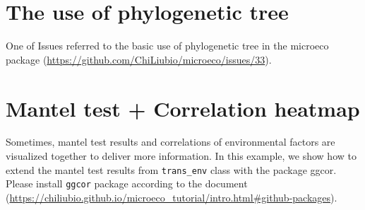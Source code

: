 \documentclass[
]{book}
\begin{document}
\section{The use of phylogenetic tree}\label{the-use-of-phylogenetic-tree}

One of Issues referred to the basic use of phylogenetic tree in the microeco package (\url{https://github.com/ChiLiubio/microeco/issues/33}).

\section{Mantel test + Correlation heatmap}\label{mantel-test-correlation-heatmap}

Sometimes, mantel test results and correlations of environmental factors are visualized together to deliver more information.
In this example, we show how to extend the mantel test results from \texttt{trans\_env} class with the package ggcor.
Please install \texttt{ggcor} package according to the document (\url{https://chiliubio.github.io/microeco_tutorial/intro.html\#github-packages}).
\end{document}
